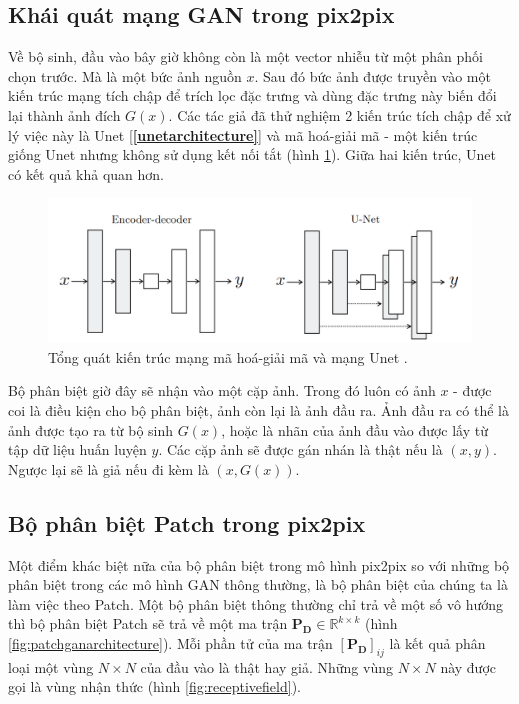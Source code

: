 \documentclass[a4paper, 12pt]{report}
\begin{document}
\subsection{Khái quát mạng GAN trong pix2pix}\label{overviewofpix2pix}

Về bộ sinh, đầu vào bây giờ không còn là một vector nhiễu từ một phân phối chọn trước.
Mà là một bức ảnh nguồn $x$.
Sau đó bức ảnh được truyền vào một kiến trúc mạng tích chập để trích lọc đặc trưng và dùng đặc trưng này biến đổi lại thành ảnh đích $G(x)$.
Các tác giả đã thử nghiệm 2 kiến trúc tích chập để xử lý việc này là Unet [\textbf{\ref{unetarchitecture}}] và mã hoá-giải mã - một kiến trúc giống Unet nhưng không sử dụng kết nối tắt (hình \ref{fig:enc-decvsunet}).
Giữa hai kiến trúc, Unet có kết quả khả quan hơn.\vspace{5pt}

\begin{figure}[!h]
\captionsetup{width=0.8\textwidth}
\centering
\includegraphics[width=15cm]{images/3_2.PNG}
\caption{Tổng quát kiến trúc mạng mã hoá-giải mã và mạng Unet \cite{isola2018imagetoimage}.}
\label{fig:enc-decvsunet}
\end{figure}

Bộ phân biệt giờ đây sẽ nhận vào một cặp ảnh.
Trong đó luôn có ảnh $x$ - được coi là điều kiện cho bộ phân biệt, ảnh còn lại là ảnh đầu ra.
Ảnh đầu ra có thể là ảnh được tạo ra từ bộ sinh $G(x)$, hoặc là nhãn của ảnh đầu vào được lấy từ tập dữ liệu huấn luyện $y$.
Các cặp ảnh sẽ được gán nhán là thật nếu là $(x, y)$.
Ngược lại sẽ là giả nếu đi kèm là $\left(x, G(x)\right)$.

\subsection{Bộ phân biệt Patch trong pix2pix}\label{patchdiscriminator}

Một điểm khác biệt nữa của bộ phân biệt trong mô hình pix2pix so với những bộ phân biệt trong các mô hình GAN thông thường, là bộ phân biệt của chúng ta là làm việc theo Patch.
Một bộ phân biệt thông thường chỉ trả về một số vô hướng thì bộ phân biệt Patch sẽ trả về một ma trận $\mathbf{P_D} \in \mathbb{R}^{k\times k}$ (hình \ref{fig:patchganarchitecture}).
Mỗi phần tử của ma trận $\left[\mathbf{P_D}\right]_{ij}$ là kết quả phân loại một vùng $N \times N$ của đầu vào là thật hay giả.
Những vùng $N \times N$ này được gọi là vùng nhận thức (hình \ref{fig:receptivefield}).\vspace{5pt}
\end{document}
